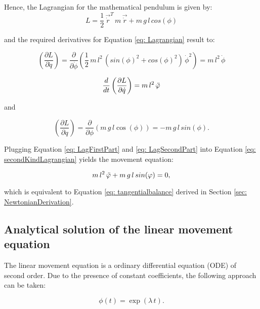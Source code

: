 \documentclass[12pt,bibstyle=none,pagenumberinfooter]{ifmdocument}
\begin{document}
Hence, the Lagrangian for the mathematical pendulum is given by:
\begin{equation}
    L = \frac{1}{2}\,\Vec{\Dot{r}}^T\,m\,\Vec{\Dot{r}} + m\,g\,l\,cos(\phi)
\end{equation}

and the required derivatives for Equation \ref{eq: Lagrangian} result to:

\begin{equation}
    \left(\frac{\partial L}{\partial \Dot{q}}\right) = \frac{\partial}{\partial \Dot{\phi}} \left( \frac{1}{2}\,m\,l^2\,(sin(\phi)^2 + cos(\phi)^2)\,\Dot{\phi}^2 \right) = m\,l^2\,\Dot{\phi}
\end{equation}

\begin{equation}
\label{eq: LagFirstPart}
    \frac{d}{dt}\left(\frac{\partial L}{\partial \Dot{q}}\right) = m\,l^2\,\Ddot{\phi}
\end{equation}

and 

\begin{equation}
\label{eq: LagSecondPart}
    \left(\frac{\partial L}{\partial q}  \right) = \frac{\partial}{\partial \phi} \left(m\,g\,l\cos(\phi)\right) = -m\,g\,l\,sin(\phi).
\end{equation}

Plugging Equation \ref{eq: LagFirstPart} and \ref{eq: LagSecondPart} into Equation \ref{eq: secondKindLagrangian} yields the movement equation:

\begin{equation}
    m\,l^2\,\Ddot{\phi} + m\,g\,l\,sin(\phi) = 0,
\end{equation}

which is equivalent to Equation \ref{eq: tangentialbalance} derived in Section \ref{sec: NewtonianDerivation}.


\subsection{Analytical solution of the linear movement equation}

The linear movement equation is a ordinary differential equation (ODE) of second order. Due to the presence of constant coefficients, the following approach can be taken:

\begin{equation}
\label{eq: linear}
    \phi (t) = \exp{(\lambda \, t)}.
\end{equation}
\end{document}
